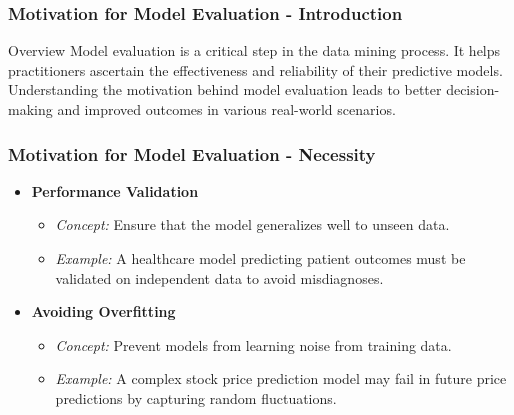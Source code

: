\documentclass[aspectratio=169]{beamer}
\begin{document}
\begin{frame}[fragile]
    \frametitle{Motivation for Model Evaluation - Introduction}
    \begin{block}{Overview}
        Model evaluation is a critical step in the data mining process. It helps practitioners ascertain the effectiveness and reliability of their predictive models. Understanding the motivation behind model evaluation leads to better decision-making and improved outcomes in various real-world scenarios.
    \end{block}
\end{frame}

\begin{frame}[fragile]
    \frametitle{Motivation for Model Evaluation - Necessity}
    \begin{itemize}
        \item \textbf{Performance Validation}
        \begin{itemize}
            \item \textit{Concept:} Ensure that the model generalizes well to unseen data.
            \item \textit{Example:} A healthcare model predicting patient outcomes must be validated on independent data to avoid misdiagnoses.
        \end{itemize}
        
        \item \textbf{Avoiding Overfitting}
        \begin{itemize}
            \item \textit{Concept:} Prevent models from learning noise from training data.
            \item \textit{Example:} A complex stock price prediction model may fail in future price predictions by capturing random fluctuations.
        \end{itemize}
    \end{itemize}
\end{frame}
\end{document}

